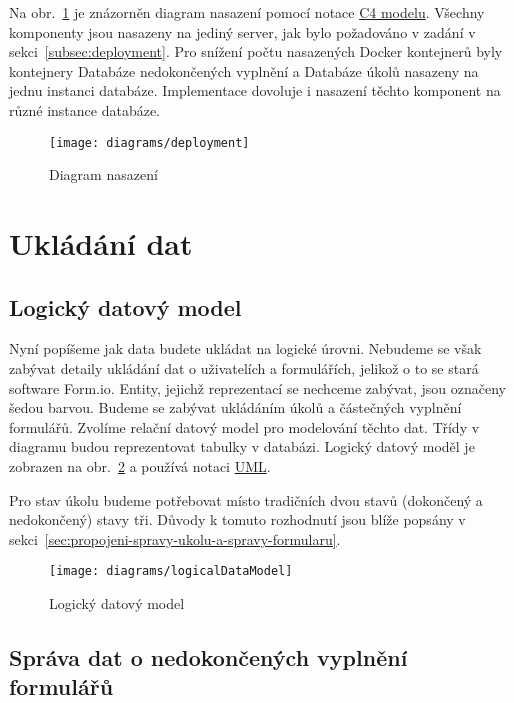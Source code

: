 Na obr.~\ref{fig:deployment} je znázorněn diagram nasazení pomocí notace \href{https://c4model.com/#DeploymentDiagram}{C4 modelu}.
Všechny komponenty jsou nasazeny na jediný server, jak bylo požadováno v zadání v sekci~\ref{subsec:deployment}.
Pro snížení počtu nasazených Docker kontejnerů byly kontejnery Databáze nedokončených vyplnění a Databáze úkolů nasazeny na jednu instanci databáze.
Implementace dovoluje i nasazení těchto komponent na různé instance databáze.

\begin{figure}[H]
    \texttt{[image: diagrams/deployment]}
    \caption{Diagram nasazení}\label{fig:deployment}
\end{figure}

\section{Ukládání dat}\label{sec:ukladani-dat}

\subsection{Logický datový model}\label{subsec:logicky-datovy-model}

Nyní popíšeme jak data budete ukládat na logické úrovni.
Nebudeme se však zabývat detaily ukládání dat o uživatelích a formulářích, jelikož o to se stará software Form.io.
Entity, jejichž reprezentací se nechceme zabývat, jsou označeny šedou barvou.
Budeme se zabývat ukládáním úkolů a částečných vyplnění formulářů.
Zvolíme relační datový model pro modelování těchto dat.
Třídy v diagramu budou reprezentovat tabulky v databázi.
Logický datový moděl je zobrazen na obr.~\ref{fig:logical-data-model} a používá notaci \href{https://www.omg.org/spec/UML/2.5.1/PDF}{UML}.

Pro stav úkolu budeme potřebovat místo tradičních dvou stavů (dokončený a nedokončený) stavy tři.
Důvody k tomuto rozhodnutí jsou blíže popsány v sekci~\ref{sec:propojeni-spravy-ukolu-a-spravy-formularu}.

\begin{figure}[H]
    \texttt{[image: diagrams/logicalDataModel]}
    \caption{Logický datový model}\label{fig:logical-data-model}
\end{figure}

\subsection{Správa dat o nedokončených vyplnění formulářů}\label{subsec:sprava-dat-o-nedokoncenych-vyplneni-formularu}


